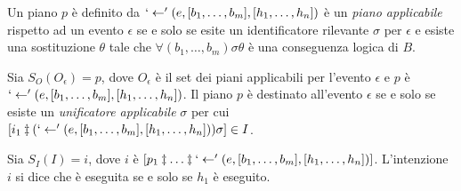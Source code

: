 \smallskip
\begin{defn}
Un piano $p$ è definito da $`\leftarrow'(e, [b_1, \ldots, b_m], [h_1, \ldots, h_n])$ è un \textit{piano applicabile} rispetto ad un evento $\epsilon$ se e solo se esite un identificatore rilevante $\sigma$ per $\epsilon$ e esiste una sostituzione $\theta$ tale che $\forall (b_1, \ldots, b_m) \sigma\theta$ è una conseguenza logica di $B$.
\end{defn}

\smallskip
\begin{defn}
Sia $S_O(O_\epsilon) = p$, dove $O_\epsilon$ è il set dei piani applicabili per l'evento $\epsilon$ e $p$ è $`\leftarrow'(e, [b_1, \ldots, b_m], [h_1, \ldots, h_n])$. Il piano $p$ è destinato all'evento $\epsilon$ se e solo se esiste un \textit{unificatore applicabile} $\sigma$ per cui $[i_1 \ddagger (`\leftarrow'(e, [b_1, \ldots, b_m], [h_1, \ldots, h_n])) \sigma] \in I$.
\end{defn}

\smallskip
\begin{defn}
Sia $S_I(I) = i$, dove $i$ è $[p_1 \ddagger \ldots \ddagger `\leftarrow'(e, [b_1, \ldots, b_m], [h_1, \ldots, h_n])]$. L'intenzione $i$ si dice che è eseguita se e solo se $h_1$ è eseguito.
\end{defn}

%
%
%

